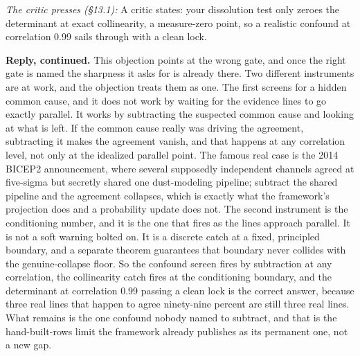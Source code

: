 \documentclass[10pt,twocolumn]{article}
\begin{document}
\emph{The critic presses (§13.1):} A critic states: your dissolution
test only zeroes the determinant at exact collinearity, a measure-zero
point, so a realistic confound at correlation 0.99 sails through with a
clean lock.

\textbf{Reply, continued.} This objection points at the wrong gate, and
once the right gate is named the sharpness it asks for is already there.
Two different instruments are at work, and the objection treats them as
one. The first screens for a hidden common cause, and it does not work
by waiting for the evidence lines to go exactly parallel. It works by
subtracting the suspected common cause and looking at what is left. If
the common cause really was driving the agreement, subtracting it makes
the agreement vanish, and that happens at any correlation level, not
only at the idealized parallel point. The famous real case is the 2014
BICEP2 announcement, where several supposedly independent channels
agreed at five-sigma but secretly shared one dust-modeling pipeline;
subtract the shared pipeline and the agreement collapses, which is
exactly what the framework's projection does and a probability update
does not. The second instrument is the conditioning number, and it is
the one that fires as the lines approach parallel. It is not a soft
warning bolted on. It is a discrete catch at a fixed, principled
boundary, and a separate theorem guarantees that boundary never collides
with the genuine-collapse floor. So the confound screen fires by
subtraction at any correlation, the collinearity catch fires at the
conditioning boundary, and the determinant at correlation 0.99 passing a
clean lock is the correct answer, because three real lines that happen
to agree ninety-nine percent are still three real lines. What remains is
the one confound nobody named to subtract, and that is the
hand-built-rows limit the framework already publishes as its permanent
one, not a new gap.
\end{document}
